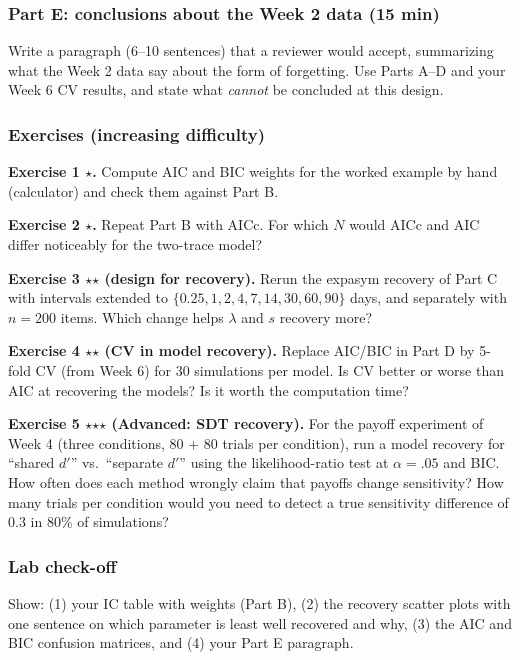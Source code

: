 \subsubsection{Part E: conclusions about the Week 2 data (15 min)}

Write a paragraph (6--10 sentences) that a reviewer would accept,
summarizing what the Week 2 data say about the form of forgetting. Use
Parts A--D and your Week 6 CV results, and state what \emph{cannot} be
concluded at this design.

\subsubsection{Exercises (increasing difficulty)}

\textbf{Exercise 1 \ensuremath{\star}.} Compute AIC and BIC weights for the worked
example by hand (calculator) and check them against Part B.

\textbf{Exercise 2 \ensuremath{\star}.} Repeat Part B with AICc. For which \(N\) would
AICc and AIC differ noticeably for the two-trace model?

\textbf{Exercise 3 \ensuremath{\star}\ensuremath{\star} (design for recovery).} Rerun the expasym recovery
of Part C with intervals extended to
\(\{0.25, 1, 2, 4, 7, 14, 30, 60, 90\}\) days, and separately with
\(n = 200\) items. Which change helps \(\lambda\) and \(s\) recovery
more?

\textbf{Exercise 4 \ensuremath{\star}\ensuremath{\star} (CV in model recovery).} Replace AIC/BIC in Part D
by 5-fold CV (from Week 6) for 30 simulations per model. Is CV better or
worse than AIC at recovering the models? Is it worth the computation
time?

\textbf{Exercise 5 \ensuremath{\star}\ensuremath{\star}\ensuremath{\star} (Advanced: SDT recovery).} For the payoff
experiment of Week 4 (three conditions, 80 + 80 trials per condition),
run a model recovery for ``shared \(d'\)'' vs.~``separate \(d'\)'' using
the likelihood-ratio test at \(\alpha = .05\) and BIC. How often does
each method wrongly claim that payoffs change sensitivity? How many
trials per condition would you need to detect a true sensitivity
difference of 0.3 in 80\% of simulations?

\subsubsection{Lab check-off}

Show: (1) your IC table with weights (Part B), (2) the recovery scatter
plots with one sentence on which parameter is least well recovered and
why, (3) the AIC and BIC confusion matrices, and (4) your Part E
paragraph.

